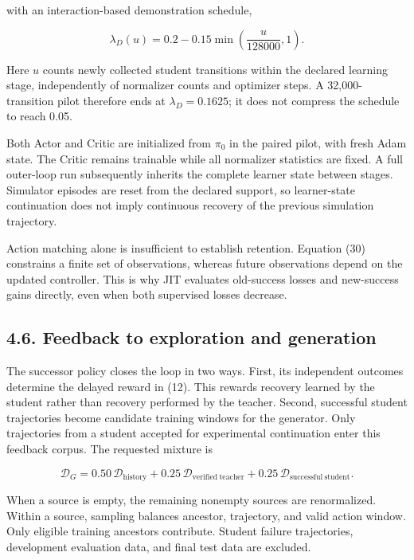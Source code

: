 \documentclass[
  american,
  11pt,
  a4paper,
]{article}
\newcounter{none} %
\begin{document}
with an interaction-based demonstration schedule,

\[
\lambda_D(u)=0.2-0.15\min\!\left(\frac{u}{128000},1\right).
\tag{32}\label{eq:32}
\]

Here \(u\) counts newly collected student transitions within the
declared learning stage, independently of normalizer counts and
optimizer steps. A 32,000-transition pilot therefore ends at
\(\lambda_D=0.1625\); it does not compress the schedule to reach 0.05.

Both Actor and Critic are initialized from \(\pi_0\) in the paired
pilot, with fresh Adam state. The Critic remains trainable while all
normalizer statistics are fixed. A full outer-loop run subsequently
inherits the complete learner state between stages. Simulator episodes
are reset from the declared support, so learner-state continuation does
not imply continuous recovery of the previous simulation trajectory.

Action matching alone is insufficient to establish retention. Equation
(30) constrains a finite set of observations, whereas future
observations depend on the updated controller. This is why JIT evaluates
old-success losses and new-success gains directly, even when both
supervised losses decrease.

\subsection{4.6. Feedback to exploration and
generation}\label{feedback-to-exploration-and-generation}

The successor policy closes the loop in two ways. First, its independent
outcomes determine the delayed reward in (12). This rewards recovery
learned by the student rather than recovery performed by the teacher.
Second, successful student trajectories become candidate training
windows for the generator. Only trajectories from a student accepted for
experimental continuation enter this feedback corpus. The requested
mixture is

\[
\mathcal D_G=
0.50\,\mathcal D_{\mathrm{history}}
+0.25\,\mathcal D_{\mathrm{verified\ teacher}}
+0.25\,\mathcal D_{\mathrm{successful\ student}}.
\tag{33}\label{eq:33}
\]

When a source is empty, the remaining nonempty sources are renormalized.
Within a source, sampling balances ancestor, trajectory, and valid
action window. Only eligible training ancestors contribute. Student
failure trajectories, development evaluation data, and final test data
are excluded.
\end{document}

